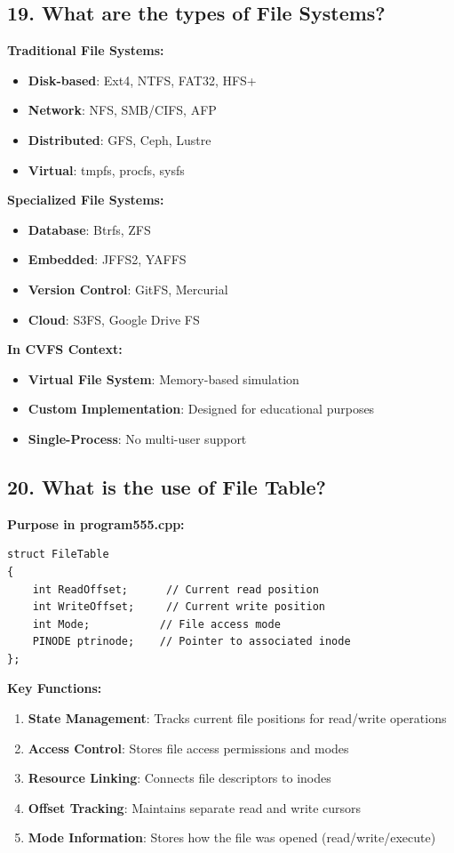 \documentclass[11pt,a4paper]{article}
\begin{document}
\subsection{19. What are the types of File Systems?}

\textbf{Traditional File Systems:}
\begin{itemize}
    \item \textbf{Disk-based}: Ext4, NTFS, FAT32, HFS+
    \item \textbf{Network}: NFS, SMB/CIFS, AFP
    \item \textbf{Distributed}: GFS, Ceph, Lustre
    \item \textbf{Virtual}: tmpfs, procfs, sysfs
\end{itemize}

\textbf{Specialized File Systems:}
\begin{itemize}
    \item \textbf{Database}: Btrfs, ZFS
    \item \textbf{Embedded}: JFFS2, YAFFS
    \item \textbf{Version Control}: GitFS, Mercurial
    \item \textbf{Cloud}: S3FS, Google Drive FS
\end{itemize}

\textbf{In CVFS Context:}
\begin{itemize}
    \item \textbf{Virtual File System}: Memory-based simulation
    \item \textbf{Custom Implementation}: Designed for educational purposes
    \item \textbf{Single-Process}: No multi-user support
\end{itemize}

\subsection{20. What is the use of File Table?}

\textbf{Purpose in program555.cpp:}
\begin{lstlisting}
struct FileTable
{
    int ReadOffset;      // Current read position
    int WriteOffset;     // Current write position
    int Mode;           // File access mode
    PINODE ptrinode;    // Pointer to associated inode
};
\end{lstlisting}

\textbf{Key Functions:}
\begin{enumerate}
    \item \textbf{State Management}: Tracks current file positions for read/write operations
    \item \textbf{Access Control}: Stores file access permissions and modes
    \item \textbf{Resource Linking}: Connects file descriptors to inodes
    \item \textbf{Offset Tracking}: Maintains separate read and write cursors
    \item \textbf{Mode Information}: Stores how the file was opened (read/write/execute)
\end{enumerate}
\end{document}
